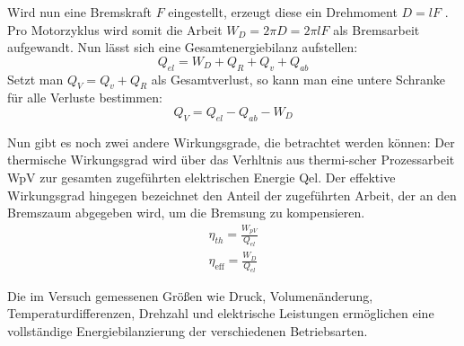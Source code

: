Wird nun eine Bremskraft \(F\) eingestellt, erzeugt diese ein Drehmoment \(D = lF\) . Pro Motorzyklus wird somit die Arbeit \(W_D=2\pi D=2\pi lF\) als Bremsarbeit aufgewandt. 
Nun lässt sich eine Gesamtenergiebilanz aufstellen: 
\begin{equation}
    Q_{el}=W_D+Q_R+Q_v+Q_{ab}
\end{equation} 
Setzt man \(Q_V = Q_v + Q_R\) als Gesamtverlust, so kann man eine untere Schranke für alle Verluste bestimmen:
\begin{equation}
    Q_V=Q_{el}-Q_{ab}-W_D
\end{equation}

Nun gibt es noch zwei andere Wirkungsgrade, die betrachtet werden können: Der thermische Wirkungsgrad wird über das Verhltnis aus thermi-scher Prozessarbeit WpV zur gesamten zugeführten elektrischen Energie Qel. Der effektive Wirkungsgrad hingegen bezeichnet den Anteil der zugeführten Arbeit, der an den Bremszaum abgegeben wird, um die Bremsung zu kompensieren. 
\begin{align}
    \eta_{th}=\frac{W_{pV}}{Q_{el}}\label{eq:etath}\\
    \eta_\text{eff}=\frac{W_D}{Q_{el}}\label{eq:etaeff}
\end{align}

Die im Versuch gemessenen Größen wie Druck, Volumenänderung, Temperaturdifferenzen, Drehzahl und elektrische Leistungen ermöglichen eine vollständige Energiebilanzierung der verschiedenen Betriebsarten.




